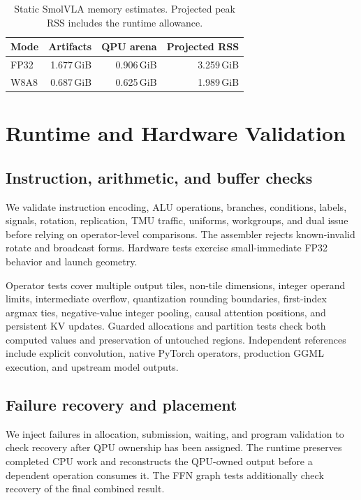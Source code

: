 \documentclass[sigplan,screen,review]{acmart}
\begin{document}
\begin{table}[t]
\centering
\caption{Static SmolVLA memory estimates. Projected peak RSS includes the runtime allowance.}
\label{tab:smolvla-memory}
\small
\begin{tabular}{@{}lrrr@{}}
\toprule
Mode & Artifacts & QPU arena & Projected RSS \\
\midrule
FP32 & 1.677\,GiB & 0.906\,GiB & 3.259\,GiB \\
W8A8 & 0.687\,GiB & 0.625\,GiB & 1.989\,GiB \\
\bottomrule
\end{tabular}
\end{table}

\section{Runtime and Hardware Validation}
\label{app:validation}

\subsection{Instruction, arithmetic, and buffer checks}

We validate instruction encoding, ALU operations, branches, conditions, labels, signals, rotation, replication, TMU traffic, uniforms, workgroups, and dual issue before relying on operator-level comparisons. The assembler rejects known-invalid rotate and broadcast forms. Hardware tests exercise small-immediate FP32 behavior and launch geometry.

Operator tests cover multiple output tiles, non-tile dimensions, integer operand limits, intermediate overflow, quantization rounding boundaries, first-index argmax ties, negative-value integer pooling, causal attention positions, and persistent KV updates. Guarded allocations and partition tests check both computed values and preservation of untouched regions. Independent references include explicit convolution, native PyTorch operators, production GGML execution, and upstream model outputs.

\subsection{Failure recovery and placement}

We inject failures in allocation, submission, waiting, and program validation to check recovery after QPU ownership has been assigned. The runtime preserves completed CPU work and reconstructs the QPU-owned output before a dependent operation consumes it. The FFN graph tests additionally check recovery of the final combined result.
\end{document}
